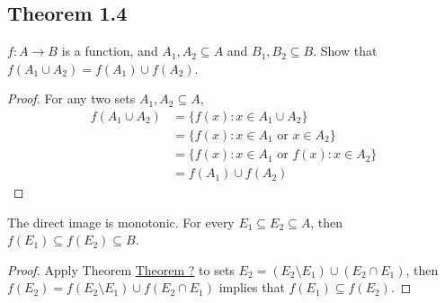 \documentclass[../../main.tex]{subfiles}
\begin{document}
\subsection{Theorem 1.4}
\begin{wts} %
   $f: A \to B$ is a function, and $A_1, A_2\subseteq A$ and $B_1, B_2\subseteq B$. Show that $f(A_1\cup A_2) = f(A_1)\cup f(A_2)$.
\end{wts}

\begin{proof}
    For any two sets $A_1, A_2\subseteq A$,
    \begin{align*}
        f(A_1\cup A_2)&= \{f(x): x\in A_1\cup A_2\}\\
        &=\{f(x): x\in A_1 \text{ or } x\in A_2\}\\
        &= \{f(x): x\in A_1 \text{ or } f(x): x\in A_2\}\\
        &= f(A_1)\cup f(A_2)
    \end{align*}
\end{proof} %
\begin{corollary}\label{corollary:direct_image_monotonic}
        The direct image is monotonic. For every $E_1\subseteq E_2\subseteq A$, then $f(E_1)\subseteq f(E_2)\subseteq B$.
    \begin{proof}
        Apply Theorem \hyperlink{subsection.0.1}{Theorem ?} to sets $E_2 = (E_2\setminus E_1) \cup (E_2\cap E_1)$, then $f(E_2) = f(E_2\setminus E_1)\cup f(E_2\cap E_1)$ implies that  $f(E_1)\subseteq f(E_2)$.
    \end{proof}
\end{corollary}
\end{document}
